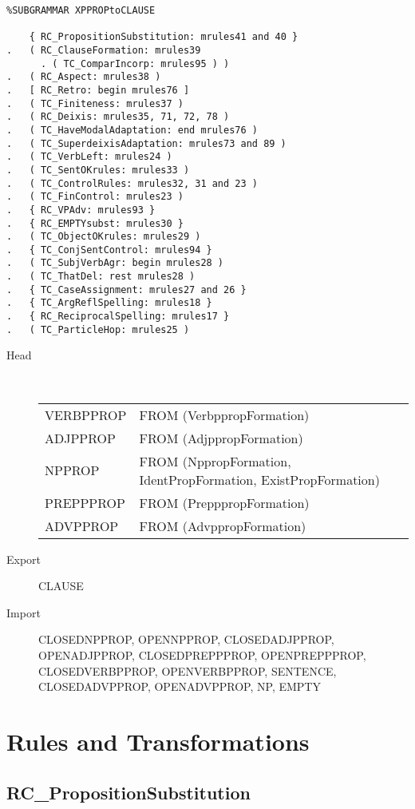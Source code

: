 \begin{verbatim}
%SUBGRAMMAR XPPROPtoCLAUSE

    { RC_PropositionSubstitution: mrules41 and 40 }
.   ( RC_ClauseFormation: mrules39 
      . ( TC_ComparIncorp: mrules95 ) )
.   ( RC_Aspect: mrules38 )
.   [ RC_Retro: begin mrules76 ]
.   ( TC_Finiteness: mrules37 )
.   ( RC_Deixis: mrules35, 71, 72, 78 )
.   ( TC_HaveModalAdaptation: end mrules76 )
.   ( TC_SuperdeixisAdaptation: mrules73 and 89 )
.   ( TC_VerbLeft: mrules24 )
.   ( TC_SentOKrules: mrules33 )
.   ( TC_ControlRules: mrules32, 31 and 23 )
.   ( TC_FinControl: mrules23 )
.   { RC_VPAdv: mrules93 }
.   { RC_EMPTYsubst: mrules30 }
.   ( TC_ObjectOKrules: mrules29 )
.   { TC_ConjSentControl: mrules94 }
.   ( TC_SubjVerbAgr: begin mrules28 )
.   ( TC_ThatDel: rest mrules28 )
.   { TC_CaseAssignment: mrules27 and 26 }
.   { TC_ArgReflSpelling: mrules18 }
.   { RC_ReciprocalSpelling: mrules17 }
.   ( TC_ParticleHop: mrules25 )
\end{verbatim}
\begin{description}
  \item[Head] \mbox{}\\
    \begin{tabular}{ll}
VERBPPROP  & FROM (VerbppropFormation)\\
ADJPPROP   & FROM (AdjppropFormation)\\
NPPROP     & FROM (NppropFormation, IdentPropFormation, ExistPropFormation)\\
PREPPPROP  & FROM (PrepppropFormation)\\
ADVPPROP   & FROM (AdvppropFormation)
    \end{tabular}
  \item[Export] CLAUSE
  \item[Import] CLOSEDNPPROP, OPENNPPROP, CLOSEDADJPPROP, OPEN\-ADJP\-PROP,
CLOSEDPREPPPROP, OPENPREPPPROP, CLOSED\-VERBP\-PROP, OPENVERBPPROP, 
SENTENCE, CLOSEDADVPPROP, OPENADVPPROP, NP, EMPTY             
\end{description}


\newpage
\section{Rules and Transformations}
\subsection{RC\_PropositionSubstitution}

